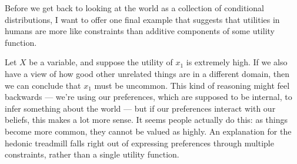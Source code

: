 \documentclass{article}
\begin{document}
	Before we get back to looking at the world as a collection of conditional distributions, I want to offer one final example that suggests that utilities in humans are more like constraints than additive components of some utility function. 
	
	Let $X$ be a variable, and suppose the utility of $x_1$ is extremely high. If we also have a view of how good other unrelated things are in a different domain, then we can conclude that $x_1$ must be uncommon. This kind of reasoning might feel backwards --- we're using our preferences, which are supposed to be internal, to infer something about the world --- but if our preferences interact with our beliefs, this makes a lot more sense. It seems people actually do this: as things become more common, they cannot be valued as highly. An explanation for the hedonic treadmill falls right out of expressing preferences through multiple constraints, rather than a single utility function.
	

	
	
\end{document}
